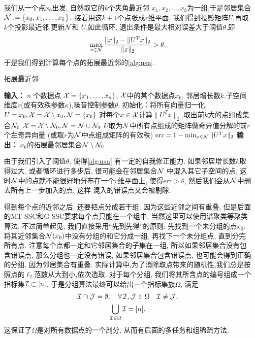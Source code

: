 我们从一个点\(x_0\)出发,  自然取它的\(k\)个夹角最近邻
\(x_1, x_2, \ldots, x_k \)为一组,于是邻居集合
\(\mathcal{N} := \left\{ x_0, x_1, \ldots, x_k \right\}.\)
接着用这\(k+1\)个点张成\(r\)维平面, 我们得到投影矩阵\(U\),再取\(k\)个投影最近邻,更新\(\mathcal{N}\)和
\(U\),如此循环, 退出条件是最大相对误差大于阈值\(\theta\),即
\[\max_{x\in \mathcal{N}} \frac{\|x\|_2-\|U^T x\|_2}{\|x\|_2} > \theta.\]
于是我们得到计算每个点的拓展最近邻的\autoref{alg:nsn}. 
\begin{algorithm}[tb] \caption{拓展最近邻}\label{alg:nsn}
  \begin{algorithmic}
    \State \textbf{输入：} \(n\) 个数据点 \(\mathcal{X} = \{x_1,\ldots,x_n\}\),
    \(\mathcal{X}\)中的某个数据点\(x_0\), 邻居增长数\(k\),子空间维度\(r\)(或有效秩参数\(\kappa\)),噪音控制参数\(\theta\).
    \State 初始化：将所有向量归一化,\(U = x_0, \mathcal{X} = \mathcal{X} \setminus x_0,
    \mathcal{N}=\{x_0\}\) 
    \Repeat
     对每个\(x\in \mathcal{X}\)计算\(\|U^Tx\|_2\),取出前\(k\)大的点组成集合\(\mathcal{N}_0\)
     \(\mathcal{X} = \mathcal{X} \setminus \mathcal{N}_0, \mathcal{N} = \mathcal{N} \cup \mathcal{N}_0\)
     \(U\)取为\(\mathcal{N}\)中所有点组成的矩阵做奇异值分解的前\(r\)个左奇异向量
    (或取\(r\)为\(\mathcal{N}\)中点组成矩阵的有效秩)
     \(\text{err}=1 - \min_{x \in \mathcal{N}}\|U^T x\|_2\)
    \State \textbf{输出：} \(x_0\)的拓展最邻居集合\(\mathcal{N} \setminus \mathcal{N}_0\)
  \end{algorithmic}
\end{algorithm}

由于我们引入了阈值\(\theta\), 使得\autoref{alg:nsn} 有一定的自我修正能力.
如果邻居增长数\(k\)取得过大, 或者循环进行多步后, 很可能会在邻居集合\(\mathcal{N}\)
中混入其它子空间的点, 这时\(\mathcal{N}\)中的点就不能很好地分布在一个\(r\)维平面上,
使得\(\text{err}>\theta\), 然后我们会从\(\mathcal{N}\)中删去所有上一步加入的点, 这样
混入的错误点又会被剔除. 

得到每个点的近邻之后, 还要把点分成若干组, 因为这些近邻之间有重叠,
但是后面的MT-SSC和G-SSC要求每个点只能在一个组中.
当然这里可以使用谱聚类等聚类算法, 不过简单起见, 我们直接采用``先到先得''的原则:
先找到一个未分组的点\(x_0\). 将其近邻集合\(\mathcal{N}(x_0)\)中没有分组的和它分成一组,
再找下一个未分组点, 直到分完所有点.
注意每个点都一定和它邻居集合的子集在一组, 所以如果邻居集合没有包含错误点,
那么分组也一定没有错误, 如果邻居集合包含错误点, 也可能会得到正确的分组,
因为邻居集合有重叠.
实际计算中,为了消除取点带来的随机性,我们总是按照点的\(\ell_2\)范数从大到小,依次选取.
对于每个分组, 我们将其所含点的编号组成一个指标集\(\mathcal{I} \subset [n]\),
于是分组算法最终可以给出一个指标集族\(\Omega\), 满足
\begin{gather}
  \mathcal{I} \cap \mathcal{J} = \emptyset,\quad \forall \,\mathcal{I}, \mathcal{J} \in \Omega\quad
  \mathcal{I} \neq \mathcal{J}, \label{eq:nointer}\\
  \bigcup_{\mathcal{I}\in \Omega} \mathcal{I} = [n].\label{eq:full} 
\end{gather}
这保证了\(\Omega\)是对所有数据点的一个剖分, 从而有后面的多任务和组稀疏方法.

